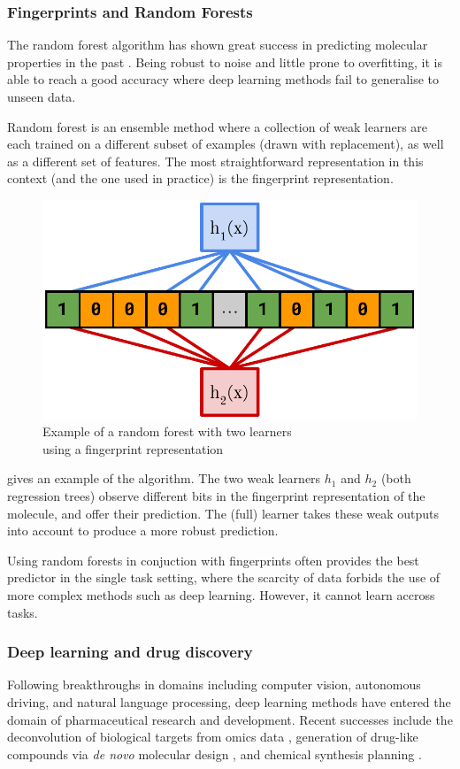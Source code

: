\documentclass[11pt]{article}
\numberwithin{equation}{subsection}
\begin{document}
\subsubsection{Fingerprints and Random Forests}

The random forest algorithm has shown great success in predicting molecular properties in the past \citep{svetnik2003random, kensert2018evaluating}. Being robust to noise and little prone to overfitting, it is able to reach a good accuracy where deep learning methods fail to generalise to unseen data.

Random forest is an ensemble method where a collection of weak learners are each trained on a different subset of examples (drawn with replacement), as well as a different set of features. The most straightforward representation in this context (and the one used in practice) is the fingerprint representation.

\begin{figure}[ht]
  \includegraphics[width=.4\textwidth,center]{scoring/ECFP+RF}
  \caption{Example of a random forest with two learners\\using a fingerprint representation}
  \label{fig:ecfp+rf}
\end{figure}

 gives an example of the algorithm. The two weak learners $h_1$ and $h_2$ (both regression trees) observe different bits in the fingerprint representation of the molecule, and offer their prediction. The (full) learner takes these weak outputs into account to produce a more robust prediction.

Using random forests in conjuction with fingerprints often provides the best predictor in the single task setting, where the scarcity of data forbids the use of more complex methods such as deep learning. However, it cannot learn accross tasks.


\subsubsection{Deep learning and drug discovery}

Following breakthroughs in domains including computer vision, autonomous driving, and natural language processing, deep learning methods have entered the domain of pharmaceutical research and development. Recent successes include the deconvolution of biological targets from omics data \citep{min2017deep}, generation of drug-like compounds via \textit{de novo} molecular design \citep{xu2019deep}, and chemical synthesis planning \citep{segler2017neural, segler2017learning}.
\end{document}
